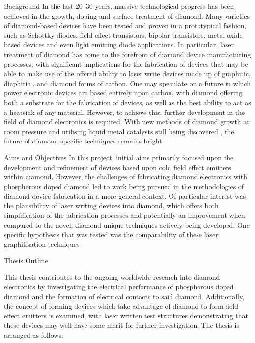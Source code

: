 \begin{refsection}
\begin{introduction}
\begin{section}{Background}
{In the last 20--30 years, massive technological progress has been achieved in the growth, doping and surface treatment of diamond. Many varieties of diamond-based devices have been tested and proven in a prototypical fashion, such as Schottky diodes, field effect transistors, bipolar transistors, metal oxide based devices and even light emitting diode applications. In particular, laser treatment of diamond has come to the forefront of diamond device manufacturing processes, with significant implications for the fabrication of devices that may be able to make use of the offered ability to laser write devices made up of graphitic, diaphitic \cite{Nemeth2021}, and diamond forms of carbon. One may speculate on a future in which power electronic devices are based entirely upon carbon, with diamond offering both a substrate for the fabrication of devices, as well as the best ability to act as a heatsink of any material. However, to achieve this, further development in the field of diamond electronics is required. With new methods of diamond growth at room pressure and utilising liquid metal catalysts still being discovered \cite{Gong2024}, the future of diamond specific techniques remains bright.
}
\end{section}
\begin{section}{Aims and Objectives}
{
 In this project, initial aims primarily focused upon the development and refinement of devices based upon cold field effect emitters within diamond. However, the challenges of fabricating diamond electronics with phosphorous doped diamond led to work being pursued in the methodologies of diamond device fabrication in a more general context. Of particular interest was the plausibility of laser writing devices into diamond, which offers both simplification of the fabrication processes and potentially an improvement when compared to the novel, diamond unique techniques actively being developed. One specific hypothesis that was tested was the comparability of these laser graphitisation techniques
}
\end{section}
\begin{section}{Thesis Outline}
{
This thesis contributes to the ongoing worldwide research into diamond electronics by investigating the electrical performance of phosphorous doped diamond and the formation of electrical contacts to said diamond. Additionally, the concept of forming devices which take advantage of diamond to form field effect emitters is examined, with laser written test structures demonstrating that these devices may well have some merit for further investigation. The thesis is arranged as follows:

}
\end{section}
\end{introduction}
\end{refsection}
